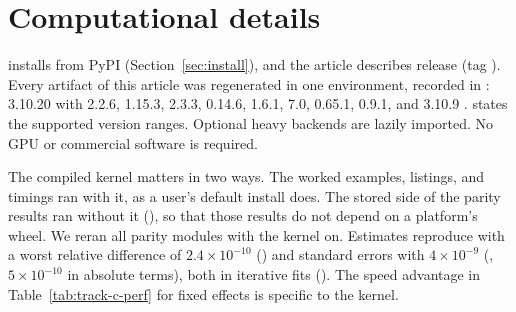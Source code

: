 \section{Computational details}\label{sec:compdetails}

\statspai{} installs from PyPI (Section~\ref{sec:install}), and the article
describes release \StatsPAIVersion{} (tag ). Every artifact of
this article was regenerated in one environment, recorded in
:  3.10.20 with
 2.2.6,  1.15.3,  2.3.3, 
0.14.6,  1.6.1,  7.0,  0.65.1,
 0.9.1, and  3.10.9
\citep{hunter2007matplotlib}.  states the
supported version ranges. Optional heavy backends are lazily imported. No GPU
or commercial software is required.

The compiled kernel matters in two ways. The worked examples, listings, and
timings ran with it, as a user's default install does. The stored
\statspai{} side of the parity results ran without it
(), so that those results do not depend on a
platform's wheel. We reran all \RParityModuleCount{} parity modules with the
kernel on. Estimates reproduce with a worst relative difference of
\(2.4\times10^{-10}\) () and standard errors with
\(4\times10^{-9}\) (, \(5\times10^{-10}\) in absolute
terms), both in iterative fits
(). The
speed advantage in Table~\ref{tab:track-c-perf} for fixed effects is specific
to the kernel.


